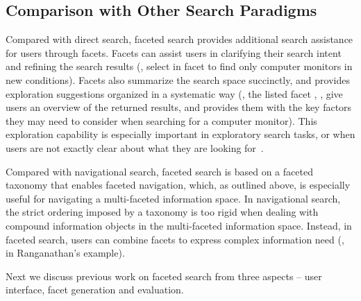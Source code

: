 
\subsection{Comparison with Other Search Paradigms}
Compared with direct search, faceted search provides additional search assistance for users through facets. Facets can assist users in clarifying their search intent and refining the search results (\eg, select  in facet  to find only computer monitors in new conditions). Facets also summarize the search space succinctly, and provides exploration suggestions organized in a systematic way (\eg, the listed facet , ,  give users an overview of the returned results, and provides them with the key factors they may need to consider when searching for a computer monitor). This exploration capability is especially important in exploratory search tasks, or when users are not exactly clear about what they are looking for~\cite{kules2009exploratory,sacco2009dynamic}.

Compared with navigational search, faceted search is based on a faceted taxonomy that enables faceted navigation, which, as outlined above, is especially useful for navigating a multi-faceted information space. In navigational search, the strict ordering imposed by a taxonomy is too rigid when dealing with compound information objects in the multi-faceted information space. Instead, in faceted search, users can combine facets to express complex information need (\eg,  in  Ranganathan's example).

Next we discuss previous work on faceted search from three aspects -- user interface, facet generation and evaluation.

